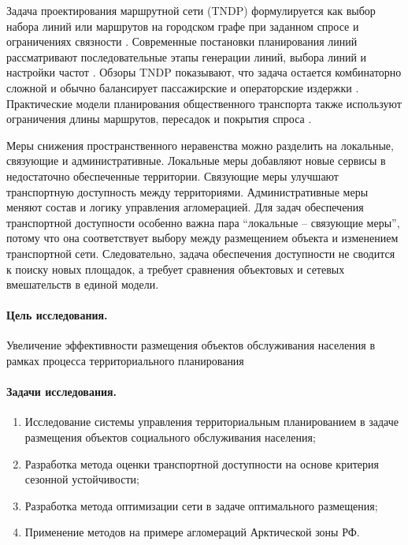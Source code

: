 \documentclass[14pt,a4paper]{extarticle}
\begin{document}
Задача проектирования маршрутной сети (TNDP) формулируется как выбор набора линий или маршрутов на городском графе при заданном спросе и ограничениях связности \cite{mandl1980tndp}. Современные постановки планирования линий рассматривают последовательные этапы генерации линий, выбора линий и настройки частот \cite{schmidt2024linePlanning}. Обзоры TNDP показывают, что задача остается комбинаторно сложной и обычно балансирует пассажирские и операторские издержки \cite{duranMicco2022tndpReview}. Практические модели планирования общественного транспорта также используют ограничения длины маршрутов, пересадок и покрытия спроса \cite{sahin2023linePlanning}.

Меры снижения пространственного неравенства можно разделить на локальные, связующие и административные. Локальные меры добавляют новые сервисы в недостаточно обеспеченные территории. Связующие меры улучшают транспортную доступность между территориями. Административные меры меняют состав и логику управления агломерацией. Для задач обеспечения транспортной доступности особенно важна пара ``локальные -- связующие меры'', потому что она соответствует выбору между размещением объекта и изменением транспортной сети. Следовательно, задача обеспечения доступности не сводится к поиску новых площадок, а требует сравнения объектовых и сетевых вмешательств в единой модели.

\paragraph*{Цель исследования.}
Увеличение эффективности размещения объектов обслуживания населения в рамках процесса территориального планирования

\paragraph*{Задачи исследования.}
\begin{enumerate}
    \item Исследование системы управления территориальным планированием в задаче размещения объектов социального обслуживания населения;
    \item Разработка метода оценки транспортной доступности на основе критерия сезонной устойчивости;
    \item Разработка метода оптимизации сети в задаче оптимального размещения;
    \item Применение методов на примере агломераций Арктической зоны РФ.
\end{enumerate}
\end{document}
